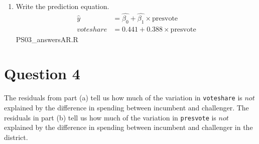 \documentclass[12pt,letterpaper]{article}
\begin{document}
\begin{enumerate}
\begin{figure}[h!]
		\end{figure}
		\item Write the prediction equation.
		\begin{align*}
			\hat{y} &= \hat{\beta_0} + \hat{\beta_1} \times  \text{presvote}\\
			voteshare &= 0.441 + 0.388 \times \text{presvote}
		\end{align*}
		 {PS03_answersAR.R}
	\end{enumerate}
	

\newpage	
\section*{Question 4}
\noindent The residuals from part (a) tell us how much of the variation in \texttt{voteshare} is $not$ explained by the difference in spending between incumbent and challenger. The residuals in part (b) tell us how much of the variation in \texttt{presvote} is $not$ explained by the difference in spending between incumbent and challenger in the district.
\end{document}
